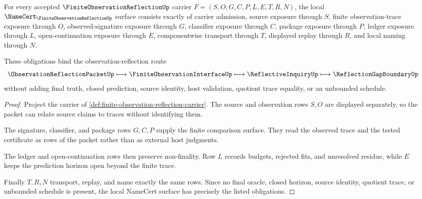 \begin{theorem}
\label{thm:finite-observation-reflection-namecert-obligations}
For every accepted $\FiniteObservationReflectionUp$ carrier $F=(S,O,G,C,P,L,E,T,R,N)$, the local $\NameCert_{\FiniteObservationReflectionUp}$ surface consists exactly of carrier admission, source exposure through $S$, finite observation-trace exposure through $O$, observed-signature exposure through $G$, classifier exposure through $C$, package exposure through $P$, ledger exposure through $L$, open-continuation exposure through $E$, componentwise transport through $T$, displayed replay through $R$, and local naming through $N$.

These obligations bind the observation-reflection route
$$
\ObservationReflectionPacketUp \longmapsto \FiniteObservationInterfaceUp \longmapsto \ReflectiveInquiryUp \longmapsto \ReflectionGapBoundaryUp
$$
without adding final truth, closed prediction, source identity, host validation, quotient trace equality, or an unbounded schedule.
\end{theorem}
\begin{proof}
Project the carrier of \autoref{def:finite-observation-reflection-carrier}. The source and observation rows $S,O$ are displayed separately, so the packet can relate source claims to traces without identifying them.

The signature, classifier, and package rows $G,C,P$ supply the finite comparison surface. They read the observed trace and the tested certificate as rows of the packet rather than as external host judgments.

The ledger and open-continuation rows then preserve non-finality. Row $L$ records budgets, rejected fits, and unresolved residue, while $E$ keeps the prediction horizon open beyond the finite trace.

Finally $T,R,N$ transport, replay, and name exactly the same rows. Since no final oracle, closed horizon, source identity, quotient trace, or unbounded schedule is present, the local NameCert surface has precisely the listed obligations.
\end{proof}

